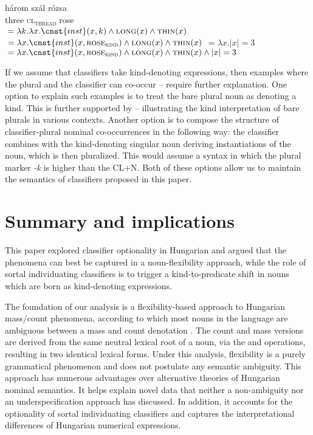 \documentclass[output=paper]{langscibook}
\begin{document}
\ea \label{schv-nem:ex:52}
\ea
\gll három szál rózsa \\
three \textsc{cl\textsubscript{thread}} rose\\
\ex {}${} = \lambda k. \lambda x.\cnst{inst}(x,k) \wedge \textsc{long}(x) \wedge \textsc{thin}(x)$
\ex {}${} = \lambda x.\cnst{inst}(x,\textsc{rose}_{\textsc{kind}}) \wedge \textsc{long}(x) \wedge \textsc{thin}(x)$
\ex {}${} = \lambda x.  |x| =3$
\ex {}\\${} =  \lambda x.\cnst{inst}(x,\textsc{rose}_{\textsc{kind}}) \wedge \textsc{long}(x) \wedge \textsc{thin}(x) \wedge |x| =3$
\z
\z

\noindent If we assume that classifiers take kind-denoting expressions, then examples where the plural and the classifier can co-occur -- require further explanation. One option to explain such examples is to treat the bare plural noun as denoting a kind. This is further supported by -- illustrating the kind interpretation of bare plurals in various contexts. Another option is to compose the structure of classifier-plural nominal co-occurrences in the following way: the classifier combines with the kind-denoting singular noun deriving instantiations of the noun, which is then pluralized. This would assume a syntax in which the plural marker \textit{-k} is higher than the CL+N. Both of these options allow us to maintain the semantics of classifiers proposed in this paper.  

\section{Summary and implications} \label{schv-nem:sec:6}

This paper explored classifier optionality in Hungarian and argued that the phenomena can best be captured in a noun-flexibility approach, while the role of sortal individuating classifiers is to trigger a kind-to-predicate shift in nouns which are born as kind-denoting expressions.  

The foundation of our analysis is a flexibility-based approach to Hungarian mass/count phenomena, according to which most nouns in the language are ambiguous between a mass and count denotation \citep{schvarcz-rothstein-17}. The count and mass versions are derived from the same neutral lexical root of a noun, via the  and  operations, resulting in  two identical lexical forms. Under this analysis, flexibility is a purely grammatical phenomenon and does not postulate any semantic ambiguity. This approach has numerous advantages over alternative theories of Hungarian nominal semantics. It  helps explain novel data that neither a non-ambiguity \citep{dekany-11, csirmaz-dekany-14} nor an underspecification \citep{erbach-etal-19} approach has discussed. In addition, it accounts for the optionality of sortal individuating classifiers and captures the interpretational differences of Hungarian numerical expressions. 
\end{document}
